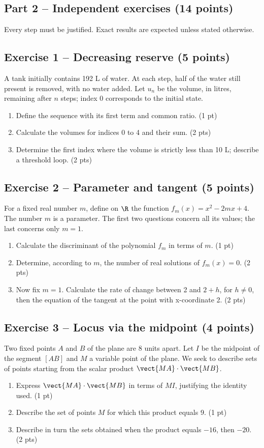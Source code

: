 \mxnewpage\subsection*{Part 2 -- Independent exercises (14 points)}
Every step must be justified. Exact results are expected unless stated otherwise.
\subsection*{Exercise 1 -- Decreasing reserve (5 points)}
A tank initially contains 192 L of water. At each step, half of the water still present is removed, with no water added. Let $u_n$ be the volume, in litres, remaining after $n$ steps; index 0 corresponds to the initial state.
\begin{enumerate}
\item Define the sequence with its first term and common ratio. \hfill(1 pt)
\item Calculate the volumes for indices 0 to 4 and their sum. \hfill(2 pts)
\item Determine the first index where the volume is strictly less than 10 L; describe a threshold loop. \hfill(2 pts)
\end{enumerate}
\subsection*{Exercise 2 -- Parameter and tangent (5 points)}
For a fixed real number $m$, define on $\R$ the function $f_m(x)=x^2-2mx+4$. The number $m$ is a parameter. The first two questions concern all its values; the last concerns only $m=1$.
\begin{enumerate}
\item Calculate the discriminant of the polynomial $f_m$ in terms of $m$. \hfill(1 pt)
\item Determine, according to $m$, the number of real solutions of $f_m(x)=0$. \hfill(2 pts)
\item Now fix $m=1$. Calculate the rate of change between 2 and $2+h$, for $h\ne0$, then the equation of the tangent at the point with x-coordinate 2. \hfill(2 pts)
\end{enumerate}
\subsection*{Exercise 3 -- Locus via the midpoint (4 points)}
Two fixed points $A$ and $B$ of the plane are 8 units apart. Let $I$ be the midpoint of the segment $[AB]$ and $M$ a variable point of the plane. We seek to describe sets of points starting from the scalar product $\vect{MA}\cdot\vect{MB}$.
\begin{enumerate}
\item Express $\vect{MA}\cdot\vect{MB}$ in terms of $MI$, justifying the identity used. \hfill(1 pt)
\item Describe the set of points $M$ for which this product equals 9. \hfill(1 pt)
\item Describe in turn the sets obtained when the product equals $-16$, then $-20$. \hfill(2 pts)
\end{enumerate}
